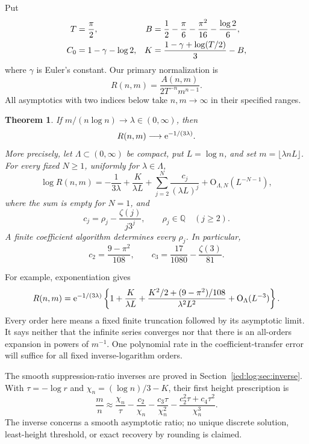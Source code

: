 \documentclass[11pt,letterpaper]{article}
\newtheorem{theorem}{Theorem}[section]
\theoremstyle{remark}\newtheorem{remark}[theorem]{Remark}
\newcommand{\Oh}{\mathrm O}\newcommand{\supp}{\operatorname{supp}}
\begin{document}
Put
\begin{align}\label{ied:log:eq:constants}
 T&=\frac\pi2,&
 B&=\frac12-\frac\pi6-\frac{\pi^2}{16}-\frac{\log2}{6},\\
 C_0&=1-\gamma-\log2,&
 K&=\frac{1-\gamma+\log(T/2)}3-B,\notag
\end{align}
where $\gamma$ is Euler's constant. Our primary normalization is
\begin{equation}\label{ied:log:eq:R}
 R(n,m)=\frac{A(n,m)}{2T^{-n}m^{n-1}}.
\end{equation}
All asymptotics with two indices below take $n,m\to\infty$ in their specified ranges.

\begin{theorem}\label{ied:log:thm:crossover}
If $m/(n\log n)\to\lambda\in(0,\infty)$, then
\begin{equation}\label{ied:log:eq:crossover}
 R(n,m)\longrightarrow\mathrm e^{-1/(3\lambda)}.
\end{equation}
More precisely, let $\Lambda\subset(0,\infty)$ be compact, put $L=\log n$, and set $m=\lfloor\lambda nL\rfloor$. For every fixed $N\ge1$, uniformly for $\lambda\in\Lambda$,
\begin{equation}\label{ied:log:eq:logcross}
 \log R(n,m)=-\frac1{3\lambda}+\frac{K}{\lambda L}
       +\sum_{j=2}^N\frac{c_j}{(\lambda L)^j}
       +\Oh_{\Lambda,N}(L^{-N-1}),
\end{equation}
where the sum is empty for $N=1$, and
\begin{equation}\label{ied:log:eq:cs}
 c_j=\rho_j-\frac{\zeta(j)}{j3^j},\qquad \rho_j\in\mathbb Q\quad(j\ge2).
\end{equation}
A finite coefficient algorithm determines every $\rho_j$. In particular,
\[
 c_2=\frac{9-\pi^2}{108},\qquad
 c_3=\frac{17}{1080}-\frac{\zeta(3)}{81}.
\]
\end{theorem}
For example, exponentiation gives
\begin{equation}\label{ied:log:eq:Rcross}
 R(n,m)=\e^{-1/(3\lambda)}
 \left\{1+\frac{K}{\lambda L}
 +\frac{K^2/2+(9-\pi^2)/108}{\lambda^2L^2}
 +\Oh_\Lambda(L^{-3})\right\}.
\end{equation}
Every order here means a fixed finite truncation followed by its asymptotic limit. It says neither that the infinite series converges nor that there is an all-orders expansion in powers of $m^{-1}$. One polynomial rate in the coefficient-transfer error will suffice for all fixed inverse-logarithm orders.

The smooth suppression-ratio inverses are proved in Section~\ref{ied:log:sec:inverse}. With $\tau=-\log r$ and $\chi_n=(\log n)/3-K$, their first height prescription is
\begin{equation}\label{ied:log:eq:inversepreview}
 \frac mn\approx\frac{\chi_n}{\tau}-\frac{c_2}{\chi_n}
 -\frac{c_3\tau}{\chi_n^2}
 -\frac{c_2^2\tau+c_4\tau^2}{\chi_n^3}.
\end{equation}
The inverse concerns a smooth asymptotic ratio; no unique discrete solution, least-height threshold, or exact recovery by rounding is claimed.
\end{document}
